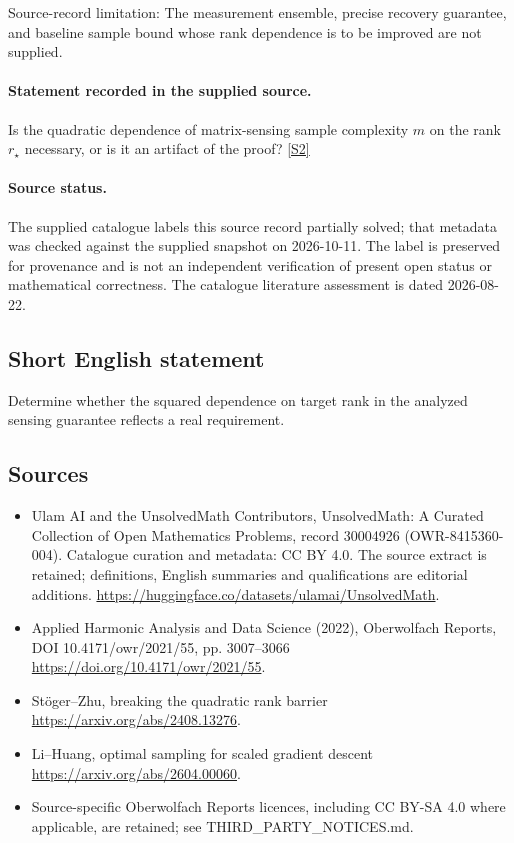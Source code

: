 \documentclass[11pt]{article}
\begin{document}
Source-record limitation: The measurement ensemble, precise recovery guarantee, and baseline sample bound whose rank dependence is to be improved are not supplied.
\paragraph{Statement recorded in the supplied source.}
Is the quadratic dependence of matrix-sensing sample complexity $m$ on the rank $r_\star$ necessary, or is it an artifact of the proof? \href{https://doi.org/10.4171/owr/2021/55}{[S2]}
\paragraph{Source status.}
The supplied catalogue labels this source record partially solved; that metadata was checked against the supplied snapshot on 2026-10-11. The label is preserved for provenance and is not an independent verification of present open status or mathematical correctness. The catalogue literature assessment is dated 2026-08-22.
\subsection{Short English statement}
Determine whether the squared dependence on target rank in the analyzed sensing guarantee reflects a real requirement.
\subsection{Sources}
\begin{itemize}
\item[S1] Ulam AI and the UnsolvedMath Contributors, UnsolvedMath: A Curated Collection of Open Mathematics Problems, record 30004926 (OWR-8415360-004). Catalogue curation and metadata: CC BY 4.0. The source extract is retained; definitions, English summaries and qualifications are editorial additions.
\url{https://huggingface.co/datasets/ulamai/UnsolvedMath}.
\item[S2] Applied Harmonic Analysis and Data Science (2022), Oberwolfach Reports, DOI 10.4171/owr/2021/55, pp. 3007--3066
\url{https://doi.org/10.4171/owr/2021/55}.
\item[S3] Stöger--Zhu, breaking the quadratic rank barrier
\url{https://arxiv.org/abs/2408.13276}.
\item[S4] Li--Huang, optimal sampling for scaled gradient descent
\url{https://arxiv.org/abs/2604.00060}.
\item Source-specific Oberwolfach Reports licences, including CC BY-SA 4.0 where applicable, are retained; see THIRD\_PARTY\_NOTICES.md.
\end{itemize}
\end{document}
